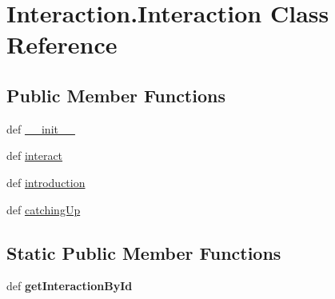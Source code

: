\hypertarget{classInteraction_1_1Interaction}{\section{\-Interaction.\-Interaction \-Class \-Reference}
\label{classInteraction_1_1Interaction}
}
\subsection*{\-Public \-Member \-Functions}
\begin{DoxyCompactItemize}
\item 
def \hyperlink{classInteraction_1_1Interaction_a1099a887f8e5cfc5d27b4033ddff031c}{\-\_\-\-\_\-init\-\_\-\-\_\-}
\item 
def \hyperlink{classInteraction_1_1Interaction_affb68931025f4b44599d77cffe303c1e}{interact}
\item 
def \hyperlink{classInteraction_1_1Interaction_a3ef6b6c3149c03c15c486fc713f8c59e}{introduction}
\item 
def \hyperlink{classInteraction_1_1Interaction_a70cdebce55c83b1bca8dfb556b751d51}{catching\-Up}
\end{DoxyCompactItemize}
\subsection*{\-Static \-Public \-Member \-Functions}
\begin{DoxyCompactItemize}
\item 
\hypertarget{classInteraction_1_1Interaction_a6d5a03ed925ef62d6b32ffa8302751f8}{def {\bfseries get\-Interaction\-By\-Id}}\label{classInteraction_1_1Interaction_a6d5a03ed925ef62d6b32ffa8302751f8}

\end{DoxyCompactItemize}
